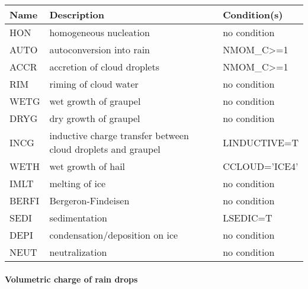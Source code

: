 \begin{longtable} {|p{}|p{}|p{}|}
\hline
Name & Description & Condition(s) \\
\hline \hline
\endhead
HON    & homogeneous nucleation         & no condition \\\hline
AUTO   & autoconversion into rain       & NMOM\_C>=1 \\\hline
ACCR   & accretion of cloud droplets    & NMOM\_C>=1 \\\hline
RIM    & riming of cloud water          & no condition \\\hline
WETG   & wet growth of graupel          & no condition \\\hline
DRYG   & dry growth of graupel          & no condition \\\hline
INCG   & inductive charge transfer between cloud droplets and graupel & LINDUCTIVE=T \\\hline
WETH   & wet growth of hail             & CCLOUD='ICE4' \\\hline
IMLT   & melting of ice                 & no condition \\\hline
BERFI  & Bergeron-Findeisen             & no condition \\\hline
SEDI   & sedimentation                  & LSEDIC=T \\\hline
DEPI   & condensation/deposition on ice & no condition \\\hline
NEUT   & neutralization                 & no condition \\\hline
\end{longtable}

\paragraph{Volumetric charge of rain drops}
\mbox{} %

